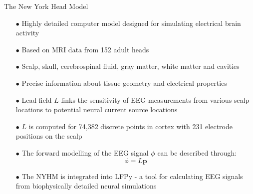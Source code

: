 \documentclass[aspectratio=169, 9pt]{beamer}
\begin{document}
\begin{frame}{The New York Head Model}
    \begin{itemize}
        \item[$\bullet$] Highly detailed computer model designed for simulating electrical brain activity
        \item[$\bullet$] Based on MRI data from 152 adult heads
        \item[$\bullet$] Scalp, skull, cerebrospinal fluid, gray matter, white matter and cavities
        \item[$\bullet$] Precise information about tissue geometry and electrical properties
        \item[$\bullet$] Lead field $L$ links the sensitivity of EEG measurements from various scalp locations to potential neural current source locations
        \item[$\bullet$] $L$ is computed for 74,382 discrete points in cortex with 231 electrode positions on the scalp
        \item[$\bullet$] The forward modelling of the EEG signal $\phi$ can be described through:
          \begin{equation}
            \phi = L\textbf{p}
          \end{equation}
        \item[$\bullet$] The NYHM is integrated into LFPy - a tool for calculating EEG signals from biophysically detailed neural simulations
    \end{itemize}
\end{frame}
\end{document}
